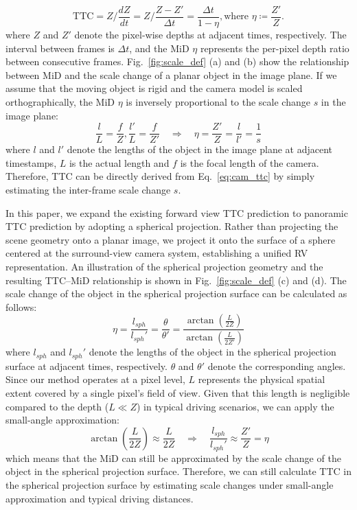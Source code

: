 \documentclass[journal]{IEEEtran}
\begin{document}
\begin{equation}
\label{eq:cam_ttc}
    \mathrm{TTC}
    = Z/{\frac{dZ}{dt}}
    = Z/{\frac{Z - Z'}{\Delta t}}
    = \frac{\Delta t}{1 - \eta},
    \text{where }\eta \coloneqq \frac{Z'}{Z}.
\end{equation}
where \(Z\) and \(Z'\) denote the pixel-wise depths at adjacent times, respectively. The interval between frames is \(\Delta t\), and the MiD \(\eta\) represents the per-pixel depth ratio between consecutive frames. Fig.~\ref{fig:scale_def} (a) and (b) show the relationship between MiD and the scale change of a planar object in the image plane. If we assume that the moving object is rigid and the camera model is scaled orthographically, the MiD \(\eta\) is inversely proportional to the scale change \(s\) in the image plane:
\begin{equation}
\label{eq:mid_scale}
    \frac{l}{L}=\frac{f}{Z}, \frac{l'}{L}=\frac{f}{Z'} \quad \Rightarrow \quad \eta = \frac{Z'}{Z} = \frac{l}{l'} = \frac{1}{s}
\end{equation}
where \(l\) and \(l'\) denote the lengths of the object in the image plane at adjacent timestamps, \(L\) is the actual length and \(f\) is the focal length of the camera. Therefore, TTC can be directly derived from Eq.~\ref{eq:cam_ttc} by simply estimating the inter-frame scale change \(s\).

In this paper, we expand the existing forward view TTC prediction to panoramic TTC prediction by adopting a spherical projection. Rather than projecting the scene geometry onto a planar image, we project it onto the surface of a sphere centered at the surround-view camera system, establishing a unified RV representation. An illustration of the spherical projection geometry and the resulting TTC–MiD relationship is shown in Fig.~\ref{fig:scale_def} (c) and (d). The scale change of the object in the spherical projection surface can be calculated as follows:
\begin{equation}
\label{eq:mid_scale_spherical}
    \eta = \frac{l_{sph}}{l_{sph}'} = \frac{\theta}{\theta'} = \frac{\arctan(\frac{L}{2Z})}{\arctan(\frac{L}{2Z'})}
\end{equation}
where \(l_{sph}\) and \(l_{sph}'\) denote the lengths of the object in the spherical projection surface at adjacent times, respectively. \(\theta\) and \(\theta'\) denote the corresponding angles. Since our method operates at a pixel level, \(L\) represents the physical spatial extent covered by a single pixel's field of view. Given that this length is negligible compared to the depth (\(L \ll Z\)) in typical driving scenarios, we can apply the small-angle approximation:
\begin{equation}
\label{eq:mid_scale_spherical_}
    \arctan(\frac{L}{2Z}) \approx \frac{L}{2Z}\quad \Rightarrow \quad \frac{l_{sph}}{l_{sph}'} \approx \frac{Z'}{Z} = \eta
\end{equation}
which means that the MiD can still be approximated by the scale change of the object in the spherical projection surface. Therefore, we can still calculate TTC in the spherical projection surface by estimating scale changes under small-angle approximation and typical driving distances.
\end{document}
